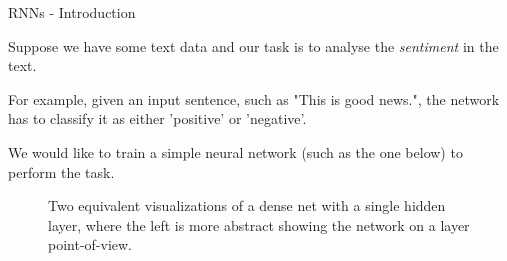 
\begin{frame} {RNNs - Introduction}
  \begin{itemize}
    \item \small{Suppose we have some text data and our task is to analyse the \textit{sentiment} in the text.
    \item For example, given an input sentence, such as "This is good news.", the network has to classify it as either 'positive' or 'negative'.
    \item We would like to train a simple neural network (such as the one below) to perform the task.}
  \end{itemize}
  \begin{figure}
      \centering
      \caption{\footnotesize{Two equivalent visualizations of a dense net with a single hidden layer, where the left is more abstract showing the network on a layer point-of-view.}}
  \end{figure}
\end{frame}

